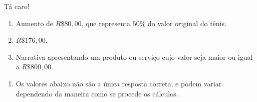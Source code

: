\begin{answer}{Tá caro!}
{
	\begin{enumerate}[itemsep=0pt]

	\item{}
	Aumento de $R\$ 80,00$, que representa $50\%$ do valor original do tênis.

	\item{}
	$R\$ 176,00$.

	\item{}
	Narrativa apresentando um produto ou serviço cujo valor seja maior ou igual a $R\$ 800,00$.

	\end{enumerate}


	\begin{enumerate}
	
	\item{}
	Os valores abaixo não são a única resposta correta, e podem variar dependendo da maneira como se procede os cálculos.

	\begin{table}[H]
	\centering
	

\end{table}
\end{enumerate}}
\end{answer}
